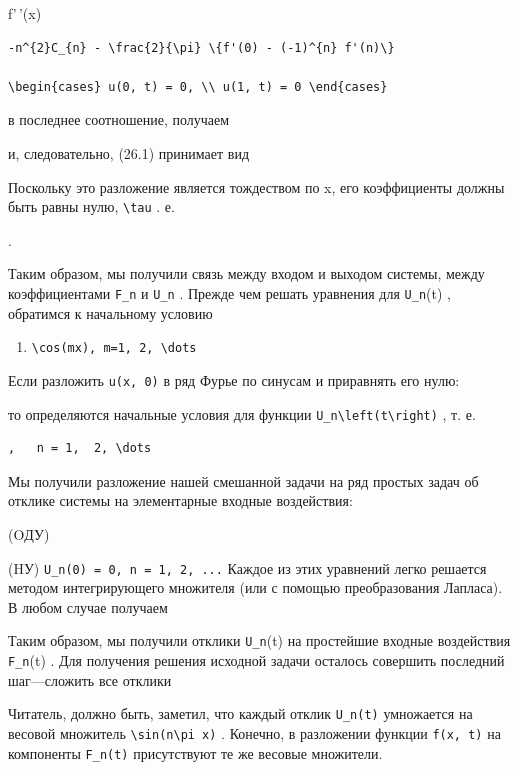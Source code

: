 \documentclass[
  ukrainian,
]{article}
\providecommand{\tightlist}{%
  \setlength{\itemsep}{0pt}\setlength{\parskip}{0pt}}
\begin{document}
f'\,'(x)

\begin{verbatim}
-n^{2}C_{n} - \frac{2}{\pi} \{f'(0) - (-1)^{n} f'(n)\}

\begin{cases} u(0, t) = 0, \\ u(1, t) = 0 \end{cases}
\end{verbatim}

в последнее соотношение, получаем

и, следовательно, (26.1) принимает вид

Поскольку это разложение является тождеством по x, его коэффициенты
должны быть равны нулю, \texttt{\textbackslash{}tau} . е.

.

Таким образом, мы получили связь между входом и выходом системы, между
коэффициентами \texttt{F\_n} и \texttt{U\_n} . Прежде чем решать
уравнения для \texttt{U\_n}(t) , обратимся к начальному условию

\begin{enumerate}
\def\labelenumi{\arabic{enumi}.}
\setcounter{enumi}{4}
\tightlist
\item
  \texttt{\textbackslash{}cos(mx),\ m=1,\ 2,\ \textbackslash{}dots}
\end{enumerate}

Если разложить \texttt{u(x,\ 0)} в ряд Фурье по синусам и приравнять его
нулю:

то определяются начальные условия для функции
\texttt{U\_n\textbackslash{}left(t\textbackslash{}right)} , т. е.

\begin{verbatim}
,   n = 1,  2, \dots
\end{verbatim}

Мы получили разложение нашей смешанной задачи на ряд простых задач об
отклике системы на элементарные входные воздействия:

(OДУ)

(HУ) \texttt{U\_n(0)\ =\ 0,\ n\ =\ 1,\ 2,\ ...} Каждое из этих уравнений
легко решается методом интегрирующего множителя (или с помощью
преобразования Лапласа). В любом случае получаем

Таким образом, мы получили отклики \texttt{U\_n}(t) на простейшие
входные воздействия \texttt{F\_n}(t) . Для получения решения исходной
задачи осталось совершить последний шаг---сложить все отклики

Читатель, должно быть, заметил, что каждый отклик \texttt{U\_n(t)}
умножается на весовой множитель
\texttt{\textbackslash{}sin(n\textbackslash{}pi\ x)} . Конечно, в
разложении функции \texttt{f(x,\ t)} на компоненты \texttt{F\_n(t)}
присутствуют те же весовые множители.
\end{document}
